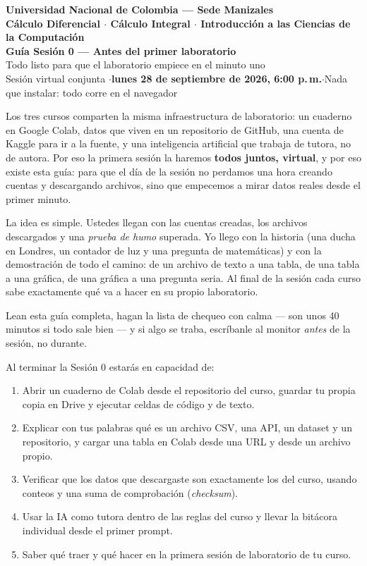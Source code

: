 \documentclass[12pt,letterpaper]{article}
\newcommand{\FECHA}{\textbf{lunes 28 de septiembre de 2026, 6:00 p.\,m.}}
\begin{document}
\begin{center}
    {\Large \textbf{Universidad Nacional de Colombia --- Sede Manizales}}\\
    {\large \textbf{Cálculo Diferencial \;$\cdot$\; Cálculo Integral \;$\cdot$\; Introducción a las Ciencias de la Computación}}\\[0.8em]
    {\LARGE \textbf{Guía Sesión 0 --- Antes del primer laboratorio}}\\[0.4em]
    {\large Todo listo para que el laboratorio empiece en el minuto uno}\\[0.5em]
    {\normalsize Sesión virtual conjunta \quad$\cdot$\quad \FECHA \quad$\cdot$\quad Nada que instalar: todo corre en el navegador}
\end{center}

\begin{cajabitacora}
Los tres cursos comparten la misma infraestructura de laboratorio: un cuaderno en Google Colab, datos que viven en un repositorio de GitHub, una cuenta de Kaggle para ir a la fuente, y una inteligencia artificial que trabaja de tutora, no de autora. Por eso la primera sesión la haremos \textbf{todos juntos, virtual}, y por eso existe esta guía: para que el día de la sesión no perdamos una hora creando cuentas y descargando archivos, sino que empecemos a mirar datos reales desde el primer minuto.

La idea es simple. Ustedes llegan con las cuentas creadas, los archivos descargados y una \emph{prueba de humo} superada. Yo llego con la historia (una ducha en Londres, un contador de luz y una pregunta de matemáticas) y con la demostración de todo el camino: de un archivo de texto a una tabla, de una tabla a una gráfica, de una gráfica a una pregunta seria. Al final de la sesión cada curso sabe exactamente qué va a hacer en su propio laboratorio.

Lean esta guía completa, hagan la lista de chequeo con calma --- son unos 40 minutos si todo sale bien --- y si algo se traba, escríbanle al monitor \emph{antes} de la sesión, no durante.
\end{cajabitacora}

\begin{cajalogros}
Al terminar la Sesión 0 estarás en capacidad de:
\begin{enumerate}[leftmargin=1.5em]
    \item Abrir un cuaderno de Colab desde el repositorio del curso, guardar tu propia copia en Drive y ejecutar celdas de código y de texto.
    \item Explicar con tus palabras qué es un archivo CSV, una API, un dataset y un repositorio, y cargar una tabla en Colab desde una URL y desde un archivo propio.
    \item Verificar que los datos que descargaste son exactamente los del curso, usando conteos y una suma de comprobación (\emph{checksum}).
    \item Usar la IA como tutora dentro de las reglas del curso y llevar la bitácora individual desde el primer prompt.
    \item Saber qué traer y qué hacer en la primera sesión de laboratorio de tu curso.
\end{enumerate}
\end{cajalogros}
\end{document}
